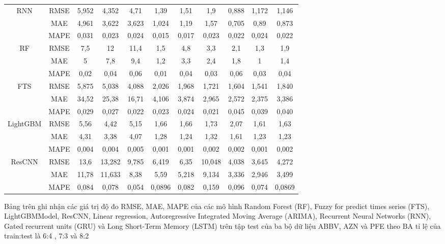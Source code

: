 \documentclass[conference]{IEEEtran}
\begin{document}
\begin{table}[H]
\begin{adjustbox}{width=0.5\textwidth}
\begin{tabular}{|c|c|c|c|c|c|c|c|c|c|c|}
         \multirow{3}{*}{RNN} & RMSE & 5,952 & 4,352 & 4,71 & 1,39 & 1,51 & 1,9 & 0,888 & 1,172 & 1,146 \\ \cline{2-11}
         & MAE & 4,961 & 3,622 & 3,623 & 1,024 & 1,19 & 1,57 & 0,705 & 0,89 & 0,873 \\ \cline{2-11}
         & MAPE & 0,031 & 0,023 & 0,024 & 0,015 & 0,017 & 0,023 & 0,022 & 0,024 & 0,022 \\ \cline{2-11} \hline
         \multirow{3}{*}{RF} & RMSE & 7,5  & 12 & 11,4 & 1,5 & 4,8 & 3,3 & 2,1 & 1,3 & 1,9 \\ \cline{2-11}
         & MAE & 5 & 7,8 & 9,4 & 1,2 & 3,3 & 2,4 & 1,8 & 1 & 1,4 \\ \cline{2-11}
         & MAPE & 0,02 & 0,04 & 0,06 & 0,01 & 0,04 & 0,03 & 0,06 & 0,03 & 0,04 \\ \cline{2-11} \hline
         \multirow{3}{*}{FTS} & RMSE & 5,875  & 5,038 & 4,088 & 2,026 & 1,968 & 1,721 & 1,604 & 1,541 & 1,840 \\ \cline{2-11}
         & MAE & 34,52 & 25,38 & 16,71 & 4,106 & 3,874 & 2,965 & 2,572 & 2,375 & 3,386 \\ \cline{2-11}
         & MAPE & 0,029 & 0,027 & 0,022 & 0,023 & 0,024 & 0,021 & 0,045 & 0,039 & 0,040 \\ \cline{2-11} \hline
         \multirow{3}{*}{LightGBM} & RMSE & 5,56  & 4,42 & 5,15 & 1,66 & 1,66 & 1,73 & 2,07 & 1,61 & 1,63 \\ \cline{2-11}
         & MAE & 4,31 & 3,38 & 4,07 & 1,28 & 1,24 & 1,32 & 1,61 & 1,23 & 1,23 \\ \cline{2-11}
         & MAPE & 0,004 & 0,004 & 0,005 & 0,001 & 0,001 & 0,002 & 0,002 & 0,001 & 0,002 \\ \cline{2-11} \hline
         \multirow{3}{*}{ResCNN} & RMSE & 13,6  & 13,282 & 9,785 & 6,419 & 6,35 & 10,048 & 4,038 & 3,645 & 4,272 \\ \cline{2-11}
         & MAE & 11,78 & 11,633 & 8,38 & 5,59 & 5,218 & 9,134 & 3,336 & 2,946 & 3,499 \\ \cline{2-11}
         & MAPE & 0,084 & 0,078 & 0,054 & 0,0896 & 0,082 & 0,159 & 0,096 & 0,074 & 0,0869 \\ \cline{2-11} \hline
    \end{tabular}
    \end{adjustbox}
\end{table}
Bảng trên ghi nhận các giá trị độ đo RMSE, MAE, MAPE của các mô hình Random Forest (RF), Fuzzy for predict times series (FTS), 
LightGBMModel, ResCNN, Linear regression, Autoregressive Integrated Moving Average (ARIMA), Recurrent Neural Networks (RNN), Gated recurrent units (GRU)
và Long Short-Term Memory (LSTM) trên tập test của ba bộ dữ liệu ABBV, AZN và PFE
theo BA tỉ lệ của train:test là 6:4 , 7:3 và 8:2
\end{document}
